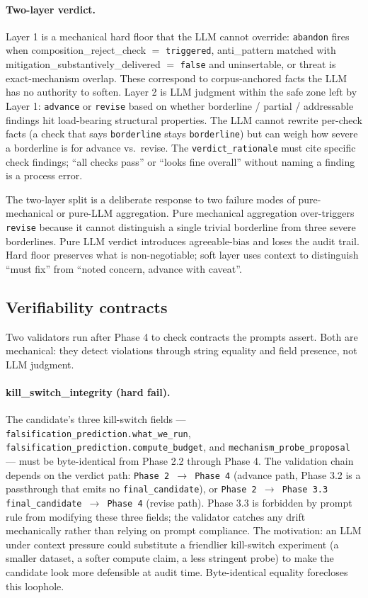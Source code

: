 \documentclass[10pt,a4paper]{article}
\begin{document}
\paragraph{Two-layer verdict.} Layer 1 is a mechanical hard floor that the LLM cannot override: \texttt{abandon} fires when composition\_reject\_check $=$ \texttt{triggered}, anti\_pattern matched with mitigation\_substantively\_delivered $=$ \texttt{false} and uninsertable, or threat is exact-mechanism overlap. These correspond to corpus-anchored facts the LLM has no authority to soften. Layer 2 is LLM judgment within the safe zone left by Layer 1: \texttt{advance} or \texttt{revise} based on whether borderline / partial / addressable findings hit load-bearing structural properties. The LLM cannot rewrite per-check facts (a check that says \texttt{borderline} stays \texttt{borderline}) but can weigh how severe a borderline is for advance vs.\ revise. The \texttt{verdict\_rationale} must cite specific check findings; ``all checks pass'' or ``looks fine overall'' without naming a finding is a process error.

The two-layer split is a deliberate response to two failure modes of pure-mechanical or pure-LLM aggregation. Pure mechanical aggregation over-triggers \texttt{revise} because it cannot distinguish a single trivial borderline from three severe borderlines. Pure LLM verdict introduces agreeable-bias and loses the audit trail. Hard floor preserves what is non-negotiable; soft layer uses context to distinguish ``must fix'' from ``noted concern, advance with caveat''.

\subsection{Verifiability contracts}
\label{subsec:skill-verifiability}

Two validators run after Phase 4 to check contracts the prompts assert. Both are mechanical: they detect violations through string equality and field presence, not LLM judgment.

\paragraph{kill\_switch\_integrity (hard fail).} The candidate's three kill-switch fields --- \texttt{falsification\_prediction.what\_we\_run}, \texttt{falsification\_prediction.compute\_budget}, and \texttt{mechanism\_probe\_proposal} --- must be byte-identical from Phase 2.2 through Phase 4. The validation chain depends on the verdict path: \texttt{Phase 2 $\to$ Phase 4} (advance path, Phase 3.2 is a passthrough that emits no \texttt{final\_candidate}), or \texttt{Phase 2 $\to$ Phase 3.3 final\_candidate $\to$ Phase 4} (revise path). Phase 3.3 is forbidden by prompt rule from modifying these three fields; the validator catches any drift mechanically rather than relying on prompt compliance. The motivation: an LLM under context pressure could substitute a friendlier kill-switch experiment (a smaller dataset, a softer compute claim, a less stringent probe) to make the candidate look more defensible at audit time. Byte-identical equality forecloses this loophole.
\end{document}
